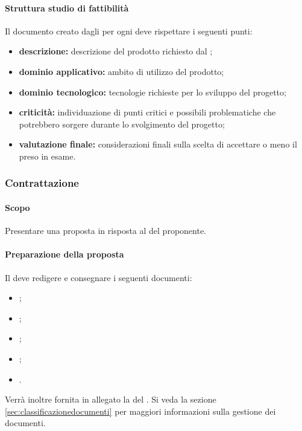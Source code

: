             \paragraph{Struttura studio di fattibilità}
            Il documento creato dagli \analisti{} per ogni  deve rispettare i seguenti punti:
            \begin{itemize}
                \item \textbf{descrizione:} descrizione del prodotto richiesto dal ;
                \item \textbf{dominio applicativo:} ambito di utilizzo del prodotto;
                \item \textbf{dominio tecnologico:} tecnologie richieste per lo sviluppo del progetto;
                \item \textbf{criticità:} individuazione di punti critici e possibili problematiche che potrebbero sorgere durante lo svolgimento del progetto;
                \item \textbf{valutazione finale:} considerazioni finali sulla scelta di accettare o meno il  preso in esame.
            \end{itemize}
        \subsubsection{Contrattazione}
            \paragraph{Scopo}
            Presentare una proposta in risposta al  del proponente.
            \paragraph{Preparazione della proposta}
            Il  deve redigere e consegnare i seguenti documenti:
            \begin{itemize}
                \item \ndp;
                \item \sdf;
                \item \adr;
                \item \pdp;
                \item \pdq.
            \end{itemize}
            Verrà inoltre fornita in allegato la \ldp{} del . Si veda la sezione \ref{sec:classificazionedocumenti} per maggiori informazioni sulla gestione dei documenti.

